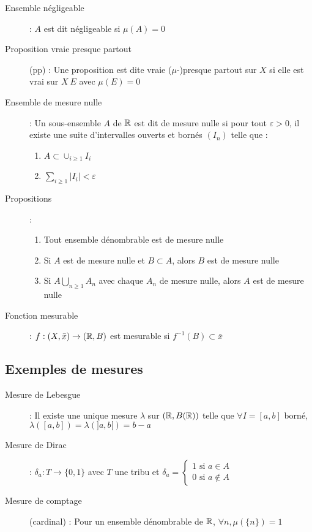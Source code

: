 \begin{description}
\begin{enumerate}
    \end{enumerate}
\item[Ensemble négligeable] : $A$ est dit négligeable si $\mu(A) = 0$
\item[Proposition vraie presque partout] (pp) : Une proposition est dite vraie ($\mu$-)presque partout sur $X$
    si elle est vrai sur $X \ E$ avec $\mu(E) = 0$
\item[Ensemble de mesure nulle] : Un sous-ensemble $A$ de $\mathbb{R}$ est dit de mesure nulle si pour tout $\varepsilon > 0$,
    il existe une suite d’intervalles ouverts et bornés $(I_n)$ telle que :
    \begin{enumerate}
    \item $A \subset \cup_{i\ge 1} I_i$
    \item $\sum_{i\ge 1} |I_i| < \varepsilon$
    \end{enumerate}
\item[Propositions] :
    \begin{enumerate}
    \item Tout ensemble dénombrable est de mesure nulle
    \item Si $A$ est de mesure nulle et $B \subset A$, alors $B$ est de mesure nulle
    \item Si $A \bigcup_{n\ge 1} A_n$ avec chaque $A_n$ de mesure nulle, alors $A$ est de mesure nulle
    \end{enumerate}
\item[Fonction mesurable] : $f:(X, \bar x)\rightarrow(\mathbb{R}, B)$ est mesurable si $f^{-1}(B) \subset \bar x$
\end{description}

\subsection{Exemples de mesures}
\begin{description}
\item[Mesure de Lebesgue] : Il existe une unique mesure $\lambda$ sur $(\mathbb{R}, B(\mathbb{R}))$ telle que
    $\forall I = [a, b]$ borné,
    $\lambda([a, b]) = \lambda(]a, b[) = b - a$
\item[Mesure de Dirac] : $\delta_a: T\rightarrow\{0, 1\}$
    avec $T$ une tribu et $\delta_a=
    \begin{cases}
        1\textrm{ si } a \in A\\
        0\textrm{ si } a \notin A
    \end{cases}$
\item[Mesure de comptage] (cardinal) : Pour un ensemble dénombrable de $\mathbb{R}$, $\forall n, \mu(\{n\}) = 1$
\end{description}